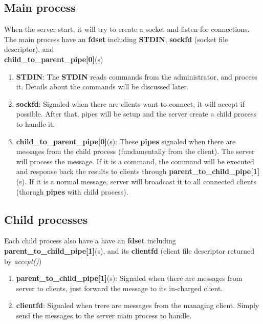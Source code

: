 \documentclass[12pt]{article}
\begin{document}
\subsection{Main process}

When the server start, it will try to create a socket and listen for connections. The main process have an \textbf{fdset} including \textbf{STDIN}, \textbf{sockfd} (socket file descriptor), and\\\textbf{child\_to\_parent\_pipe[0]}(s)

\begin{enumerate}
\item \textbf{STDIN}: The \textbf{STDIN} reads commands from the administrator, and process it. Details about the commands will be discussed later.

\item \textbf{sockfd}: Signaled when there are clients want to connect, it will accept if possible. After that, pipes will be setup and the server create a child process to handle it.

\item \textbf{child\_to\_parent\_pipe[0]}(s): These \textbf{pipes} signaled when there are messages from the child process (fundamentally from the client). The server will process the message. If it is a command, the command will be executed and response back the results to clients through \textbf{parent\_to\_child\_pipe[1]}(s). If it is a normal message, server will broadcast it to all connected clients (thorugh \textbf{pipes} with child process).
\end{enumerate}

\subsection{Child processes}

Each child process also have a have an \textbf{fdset} including \textbf{parent\_to\_child\_pipe[1]}(s), and its \textbf{clientfd} (client file descriptor returned by \textit{accept()})

\begin{enumerate}
\item \textbf{parent\_to\_child\_pipe[1]}(s): Signaled when there are messages from server to clients, just forward the message to its in-charged client.

\item \textbf{clientfd}: Signaled when trere are messages from the managing client. Simply send the messages to the server main process to handle.
\end{enumerate}




\end{document}
